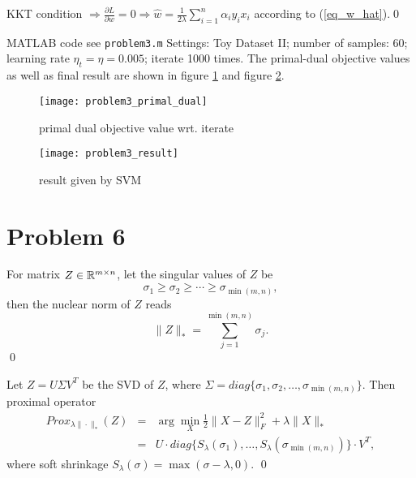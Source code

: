 \documentclass{article}
\begin{document}
\begin{myproof}[2.]
	KKT condition $\Rightarrow \frac{\partial L}{\partial w}=0\Rightarrow\hat{w} = \frac{1}{2\lambda} \sum_{i=1}^{n}\alpha_i y_i x_i$ according to (\ref{eq_w_hat}).\qed
\end{myproof}
\newpage
\begin{myproof}[3.]
	MATLAB code see \verb|problem3.m|
	\newline
	Settings: Toy Dataset II; number of samples: 60; learning rate $\eta_t = \eta = 0.005$; iterate 1000 times. The primal-dual objective values as well as final result are shown in figure \ref{fig:problem3primaldual} and figure \ref{fig:problem3result}.
	\begin{figure}[h!]
		\centering
		\texttt{[image: problem3\_primal\_dual]}
		\caption{primal dual objective value wrt. iterate}
		\label{fig:problem3primaldual}
	\end{figure}
	\begin{figure}[h!]
		\centering
		\texttt{[image: problem3\_result]}
		\caption{result given by SVM}
		\label{fig:problem3result}
	\end{figure}
	
\end{myproof}
\section*{Problem 6}
\begin{myproof} For matrix $Z\in \mathbb{R}^{m\times n}$, let the singular values of $Z$ be
	\begin{equation}
	\sigma_1\geq\sigma_2\geq\cdots\geq\sigma_{\min(m,n)},
	\end{equation}
	then the nuclear norm of $Z$ reads
	\begin{equation}
	\|Z\|_\ast = \sum_{j=1}^{\min(m,n)}\sigma_j.
	\end{equation}
\qed
\end{myproof}
\begin{myproof}
	Let $Z=U\Sigma V^T$ be the SVD of $Z$, where $\Sigma = diag\{\sigma_1,\sigma_2,\ldots,\sigma_{\min(m,n)}\}$. Then proximal operator
	\begin{eqnarray}
	Prox_{\lambda\|\cdot\|_\ast}(Z) &=& \arg\min_X \frac{1}{2}\|X-Z\|_F^2+\lambda\|X\|_\ast\\
	&=&U\cdot diag\{S_\lambda(\sigma_1),\ldots, S_\lambda(\sigma_{\min(m,n)})\}\cdot V^T,
	\end{eqnarray}
	where soft shrinkage $S_\lambda(\sigma)=\max(\sigma-\lambda,0)$.
	\qed
\end{myproof}
\end{document}
